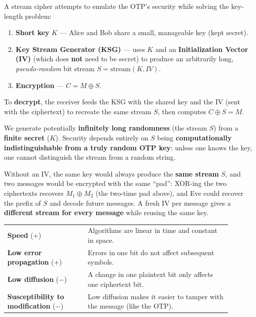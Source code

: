 \begin{defnbox}[title=Stream cipher (pseudo-OTP)]
A stream cipher attempts to emulate the OTP's security while solving the key-length
problem:
\begin{enumerate}
  \item \textbf{Short key} $K$ --- Alice and Bob share a small, manageable key (kept
        secret).
  \item \textbf{Key Stream Generator (KSG)} --- uses $K$ and an \textbf{Initialization
        Vector (IV)} (which does \textbf{not} need to be secret) to produce an
        arbitrarily long, \emph{pseudo-random} bit stream $S = \mathrm{stream}(K, IV)$.
  \item \textbf{Encryption} --- $C = M \oplus S$.
\end{enumerate}
To \textbf{decrypt}, the receiver feeds the KSG with the shared key and the IV (sent with
the ciphertext) to recreate the same stream $S$, then computes $C \oplus S = M$.
\end{defnbox}

\begin{propbox}[title=Security of the KSG]
We generate potentially \textbf{infinitely long randomness} (the stream $S$) from a
\textbf{finite secret} ($K$). Security depends entirely on $S$ being
\textbf{computationally indistinguishable from a truly random OTP key}: unless one knows
the key, one cannot distinguish the stream from a random string.
\end{propbox}

\begin{rembox}[title=Why does the KSG also take an IV?]
Without an IV, the same key would always produce the \textbf{same stream} $S$, and two
messages would be encrypted with the same ``pad'': XOR-ing the two ciphertexts recovers
$M_1 \oplus M_2$ (the two-time pad above), and Eve could recover the prefix of $S$ and
decode future messages. A fresh IV per message gives a \textbf{different stream for every
message} while reusing the same key.
\end{rembox}

\begin{propbox}[title=Stream ciphers: strengths and weaknesses]
\begin{center}
\begin{tabular}{p{0.32\linewidth}|p{0.58\linewidth}}
\textbf{Speed} (+) & Algorithms are linear in time and constant in space. \\
\textbf{Low error propagation} (+) & Errors in one bit do not affect subsequent
symbols. \\ \hline
\textbf{Low diffusion} ($-$) & A change in one plaintext bit only affects one ciphertext
bit. \\
\textbf{Susceptibility to modification} ($-$) & Low diffusion makes it easier to tamper
with the message (like the OTP).
\end{tabular}
\end{center}
\end{propbox}

